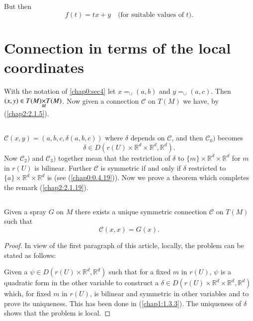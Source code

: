 But then
$$
f(t)=tx+y\quad\text{(for suitable values of $t$).}
$$

\section{Connection in terms of the local coordinates}\label{chap2:sec2}

With the notation of \ref{chap0:sec4} let
$x{\displaystyle{\mathop{=}_{\cup}}}(a,b)$ and
$y{\displaystyle{\mathop{=}_{\cup}}}(a,c)$. Then $(x,y)\in\unskip\break
T(M){\displaystyle{\mathop{\times}_{M}}}T(M)$. Now given a connection
$\mathcal{C}$ on $T(M)$ we have, by (\ref{chap2:2.1.5}).

\subsection{}\label{chap2:2.2.1}
$\mathcal{C}(x,y)=(a,b,c,\delta(a,b,c))$ where $\delta$ depends on
$\mathcal{C}$, and then $\mathcal{C}_{0})$ becomes
\begin{equation*}
\delta\in D(r(U)\times \mathbb{R}^{d}\times
\mathbb{R}^{d},\mathbb{R}^{d}).\tag{2.2.2}\label{chap2:2.2.2}
\end{equation*}
Now $\mathcal{C}_{2})$ and $\mathcal{C}_{3})$ together mean that the
restriction of $\delta$ to $\{m\}\times \mathbb{R}^{d}\times
\mathbb{R}^{d}$ for $m$ in $r(U)$ is bilinear. Further $\mathcal{C}$
is symmetric if and only if $\delta$ restricted to
$\{a\}\times\mathbb{R}^{d}\times \mathbb{R}^{d}$ is (see
(\ref{chap0:0.4.19})). Now we prove a theorem which completes the remark
(\ref{chap2:2.1.19}). 

\setcounter{subsection}{2}
\subsection{}\label{chap2:2.2.3}


\begin{theorem*}[\cite{2}, th. 2, p.~173]
Given \pageoriginale a spray $G$ on $M$ there exists a unique symmetric
connection $\mathcal{C}$ on $T(M)$ such that
$$
\mathcal{C}(x,x)=G(x).
$$
\end{theorem*}

\begin{proof}
In view of the first paragraph of this article, locally, the problem
can be stated as follows:

Given a $\psi\in D(r(U)\times\mathbb{R}^{d},\mathbb{R}^{d})$ such that
for a fixed $m$ in $r(U)$, $\psi$ is a quadratic form in the other
variable to construct a $\delta\in D(r(U)\times\mathbb{R}^{d}\times
\mathbb{R}^{d},\mathbb{R}^{d})$ which, for fixed $m$ in $r(U)$, is
bilinear and symmetric in other variables and to prove its
uniqueness. This has been done in (\ref{chap1:1.3.3}). The uniqueness of
$\delta$ shows that the problem is local.
\end{proof}


